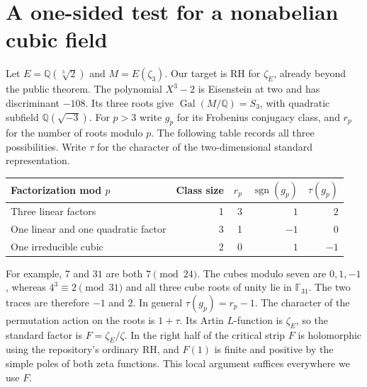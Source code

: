 \section{A one-sided test for a nonabelian cubic field}\label{sec:cubic}
Let $E=\mathbb Q(\sqrt[3]2)$ and $M=E(\zeta_3)$. Our target is RH for
$\zeta_E$, already beyond the public theorem. The polynomial $X^3-2$
is Eisenstein at two and has discriminant $-108$. Its three roots give
$\operatorname{Gal}(M/\mathbb Q)=S_3$, with quadratic subfield
$\mathbb Q(\sqrt{-3})$. For $p>3$ write $g_p$ for its Frobenius conjugacy
class, and $r_p$ for the number of roots modulo $p$. The following table
records all three possibilities. Write $\tau$ for the character of the
two-dimensional standard representation.
\begin{center}
\begin{tabular}{lrrrr}
\toprule
Factorization mod $p$ & Class size & $r_p$ & $\operatorname{sgn}(g_p)$ & $\tau(g_p)$\\
\midrule
Three linear factors & 1 & 3 & $1$ & $2$\\
One linear and one quadratic factor & 3 & 1 & $-1$ & $0$\\
One irreducible cubic & 2 & 0 & $1$ & $-1$\\
\bottomrule
\end{tabular}
\end{center}
For example, $7$ and $31$ are both $7\pmod{24}$. The cubes modulo seven are $0,1,-1$,
whereas $4^3\equiv2\pmod{31}$ and all three cube roots of unity lie in $\mathbb F_{31}$.
The two traces are therefore $-1$ and $2$. In general $\tau(g_p)=r_p-1$. The character of the permutation action
on the roots is $1+\tau$. Its Artin $L$-function is $\zeta_E$, so the
standard factor is $F=\zeta_E/\zeta$. In the right half of the critical
strip $F$ is holomorphic using the repository's ordinary RH, and
$F(1)$ is finite and positive by the simple poles of both zeta functions.
This local argument suffices everywhere we use $F$.

